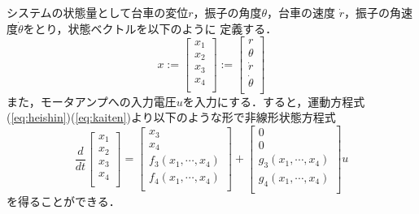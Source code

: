 システムの状態量として台車の変位$r$，振子の角度$\theta$，台車の速度
$\dot{r}$，振子の角速度$\dot{\theta}$をとり，状態ベクトルを以下のように
定義する．
\[
 x := \left[
       \begin{array}{c}
	x_1 \\
	x_2 \\
	x_3 \\
	x_4 \\
       \end{array}
      \right] :=
      \left[
       \begin{array}{c}
	r \\
	\theta \\
	\dot{r} \\
	\dot{\theta}\\
       \end{array}
      \right]
\]
また，モータアンプへの入力電圧$u$を入力にする．すると，運動方程式
(\ref{eq:heishin})(\ref{eq:kaiten})より以下のような形で非線形状態方程式
\begin{equation}
 \frac{d}{dt}
 \left[
  \begin{array}{c}
   x_1 \\
   x_2 \\
   x_3 \\
   x_4 \\
  \end{array}
 \right] =
 \left[
  \begin{array}{c}
   x_3 \\
   x_4 \\
   f_3(x_1, \cdots, x_4) \\
   f_4(x_1, \cdots, x_4) \\
  \end{array}
 \right] + 
 \left[
  \begin{array}{c}
   0 \\
   0 \\
   g_3(x_1, \cdots, x_4) \\
   g_4(x_1, \cdots, x_4) \\
  \end{array}
 \right] u
 \label{eq:nonlinsystem}
\end{equation}
を得ることができる．

